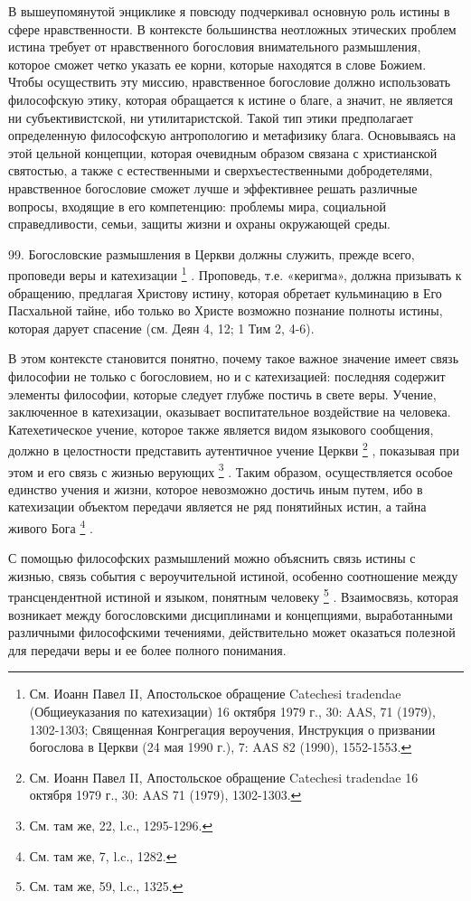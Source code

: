 \documentclass[a5paper,10pt]{article}
\begin{document}
В вышеупомянутой энциклике я повсюду подчеркивал основную роль истины в сфере
нравственности. В контексте большинства неотложных этических проблем истина
требует от нравственного богословия внимательного размышления, которое сможет
четко указать ее корни, которые находятся в слове Божием. Чтобы осуществить эту
миссию, нравственное богословие должно использовать философскую этику, которая
обращается к истине о благе, а значит, не является ни субъективистской, ни
утилитаристской. Такой тип этики предполагает определенную философскую
антропологию и метафизику блага. Основываясь на этой цельной концепции, которая
очевидным образом связана с христианской святостью, а также с естественными и
сверхъестественными добродетелями, нравственное богословие сможет лучше и
эффективнее решать различные вопросы, входящие в его компетенцию: проблемы
мира, социальной справедливости, семьи, защиты жизни и охраны окружающей среды.

99. Богословские размышления в Церкви должны служить, прежде всего, проповеди
веры и катехизации \footnote{См. Иоанн Павел II, Апостольское обращение
Catechesi tradendae (Общиеуказания по катехизации) 16 октября 1979 г., 30: AAS,
71 (1979), 1302-1303; Священная Конгрегация вероучения, Инструкция о призвании
богослова в Церкви (24 мая 1990 г.), 7: AAS 82 (1990), 1552-1553.} . Проповедь,
т.е. «керигма», должна призывать к обращению, предлагая Христову истину,
которая обретает кульминацию в Его Пасхальной тайне, ибо только во Христе
возможно познание полноты истины, которая дарует спасение (см. Деян 4, 12; 1
Тим 2, 4-6).

В этом контексте становится понятно, почему такое важное значение имеет связь
философии не только с богословием, но и с катехизацией: последняя содержит
элементы философии, которые следует глубже постичь в свете веры. Учение,
заключенное в катехизации, оказывает воспитательное воздействие на человека.
Катехетическое учение, которое также является видом языкового сообщения, должно
в целостности представить аутентичное учение Церкви \footnote{См. Иоанн Павел
II, Апостольское обращение Catechesi tradendae 16 октября 1979 г., 30: AAS 71
(1979), 1302-1303.} , показывая при этом и его связь с жизнью верующих
\footnote{См. там же, 22, l.c., 1295-1296.} .  Таким образом, осуществляется
особое единство учения и жизни, которое невозможно достичь иным путем, ибо в
катехизации объектом передачи является не ряд понятийных истин, а тайна живого
Бога \footnote{См. там же, 7, l.c., 1282.} .

С помощью философских размышлений можно объяснить связь истины с жизнью, связь
события с вероучительной истиной, особенно соотношение между трансцендентной
истиной и языком, понятным человеку \footnote{См. там же, 59, l.c., 1325.} .
Взаимосвязь, которая возникает между богословскими дисциплинами и концепциями,
выработанными различными философскими течениями, действительно может оказаться
полезной для передачи веры и ее более полного понимания.
\end{document}
